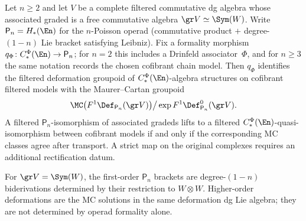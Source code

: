 \begin{lemma}
\label{lem:en-formality-deformation-classification}
\ClaimStatusProvedHere
Let $n \geq 2$ and let $V$ be a complete filtered commutative
dg algebra whose associated graded is a free commutative algebra
$\gr V\simeq \Sym(W)$. Write
$\mathsf{P}_n = H_*(\En)$ for the $n$-Poisson operad
\textup{(}commutative product $+$ degree-$(1{-}n)$ Lie
bracket satisfying Leibniz\textup{)}.
Fix a formality morphism
$q_\Phi\colon C_*^\Phi(\En)\to \mathsf{P}_n$; for $n=2$ this
includes a Drinfeld associator~$\Phi$, and for $n\geq3$ the same
notation records the chosen cofibrant chain model. Then $q_\Phi$
identifies the filtered deformation groupoid of
$C_*^\Phi(\En)$-algebra structures on cofibrant filtered models with
the Maurer--Cartan groupoid
\[
 \MC\bigl(F^1\Def_{\mathsf{P}_n}(\gr V)\bigr)
 \big/
 \exp F^1\Def_{\mathsf{P}_n}^0(\gr V).
\]
A filtered $\mathsf{P}_n$-isomorphism of associated gradeds lifts to
a filtered $C_*^\Phi(\En)$-quasi-isomorphism between cofibrant models
if and only if the corresponding MC classes agree after transport.
A strict map on the original complexes requires an additional
rectification datum.

For $\gr V=\Sym(W)$, the first-order $\mathsf{P}_n$ brackets are
degree-$(1{-}n)$ biderivations determined by their restriction to
$W\otimes W$. Higher-order deformations are the MC solutions in the
same deformation dg Lie algebra; they are not determined by
operad formality alone.
\end{lemma}

